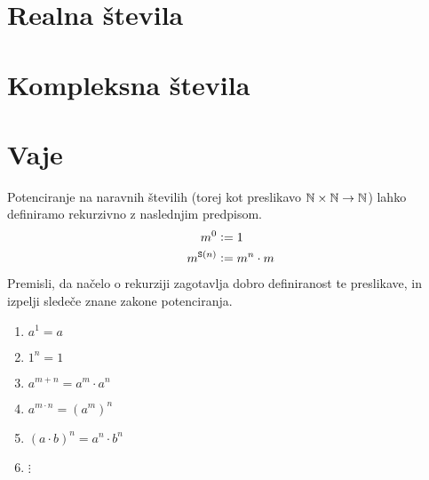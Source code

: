\section{Realna števila}
\section{Kompleksna števila}



\section{Vaje}

\begin{vaja}
Potenciranje na naravnih številih (torej kot preslikavo $\mathbb{N} \times \mathbb{N} \to \mathbb{N}$) lahko definiramo rekurzivno z naslednjim predpisom.
\begin{align*}
m^0 &\mathrel{\mathop:}= 1 \\
m^{\mathtt{S}(n)} &\mathrel{\mathop:}= m^n \cdot m
\end{align*}
Premisli, da načelo o rekurziji zagotavlja dobro definiranost te preslikave, in izpelji sledeče znane zakone potenciranja.
\begin{enumerate}
\item
$a^1 = a$
\item
$1^n = 1$
\item
$a^{m + n} = a^m \cdot a^n$
\item
$a^{m \cdot n} = (a^m)^n$
\item
$(a \cdot b)^n = a^n \cdot b^n$
\item
$\vdots$
\end{enumerate}
\end{vaja}


